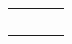 \documentclass[journal]{IEEEtran}
\begin{document}
\begin{table}[!htb]
{\begin{center}
\begin{tabular}{ m{1.6cm} m{1.8cm} m{1.8cm} m{1.8cm} }
        \cmidrule(lr){1-1} \cmidrule(lr){2-2}
        \cmidrule(lr){3-3} \cmidrule(lr){4-4}

        \centering{$p_{L_b}$ (\si{\mm})}
        & \centering{$\mathcal{N}(2.77, 0.58)$}
        & \centering{$\mathcal{N}(2.75, 0.56)$}
        & \centering{$\mathcal{N}(2.79, 0.56)$}
          \tabularnewline%

        \cmidrule(lr){1-1} \cmidrule(lr){2-2}
        \cmidrule(lr){3-3} \cmidrule(lr){4-4}

        \centering{$p_{L_c}$ (\si{\mm})}
        & \centering{$\mathcal{N}(2.10, 0.57)$}
        & \centering{$\mathcal{N}(2.03, 0.52)$}
        & \centering{$\mathcal{N}(2.10, 0.54)$}
          \tabularnewline%

        \cmidrule(lr){1-1} \cmidrule(lr){2-2}
        \cmidrule(lr){3-3} \cmidrule(lr){4-4}

        \centering{$p_{\delta_{\phi_x}}$ (\si{\radian})}
        & \centering{$\mathcal{U}(-\frac{\pi}{2}, \frac{\pi}{2})$}
        & \centering{$\mathcal{U}(-\frac{\pi}{2}, \frac{\pi}{2})$}
        & \centering{$\mathcal{U}(-\frac{\pi}{2}, \frac{\pi}{2})$}
          \tabularnewline%

        \cmidrule(lr){1-1} \cmidrule(lr){2-2}
        \cmidrule(lr){3-3} \cmidrule(lr){4-4}

        \centering{$p_{\delta_{\phi_y}}$ (\si{\radian})}
        & \centering{$\mathcal{N}(-0.09, 0.4)$}
        & \centering{$\mathcal{N}(-0.15, 0.38)$}
        & \centering{$\mathcal{N}(-0.28, 0.47)$}
          \tabularnewline%

        \cmidrule(lr){1-1} \cmidrule(lr){2-2}
        \cmidrule(lr){3-3} \cmidrule(lr){4-4}

        \centering{$p_{\delta_{\phi_z}}$ (\si{\radian})}
        & \centering{$\mathcal{N}(0, 0.26)$}
        & \centering{$\mathcal{N}(0.01, 0.5)$}
        & \centering{$\mathcal{N}(-0.01, 0.43)$}
          \tabularnewline%

        \bottomrule

      \end{tabular}

      \label{tab:summary-inferred-params}
    \end{center}
  }
\end{table}
\end{document}
